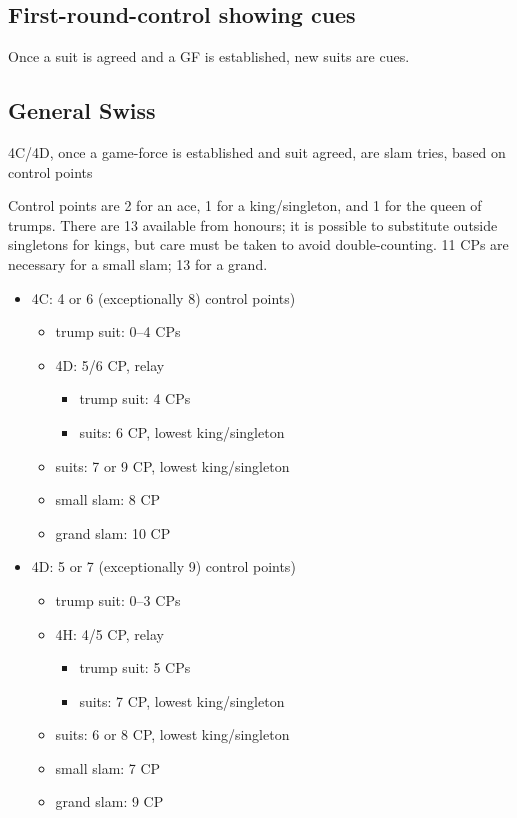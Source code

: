 \documentclass[a4paper,12pt]{article}
\begin{document}
\subsection{First-round-control showing cues}

Once a suit is agreed and a GF is established, new suits are cues.

\subsection{General Swiss}

4C/4D, once a game-force is established and suit agreed, are slam tries, based
on control points

Control points are 2 for an ace, 1 for a king/singleton, and 1 for the queen of
trumps.  There are 13 available from honours; it is possible to substitute
outside singletons for kings, but care must be taken to avoid double-counting.
11 CPs are necessary for a small slam; 13 for a grand.

\begin{itemize}
\item 4C: 4 or 6 (exceptionally 8) control points)
	\begin{itemize}
   \item trump suit: 0--4 CPs
   \item 4D: 5/6 CP, relay
		\begin{itemize}
      \item trump suit: 4 CPs
      \item suits: 6 CP, lowest king/singleton
		\end{itemize}
   \item suits: 7 or 9 CP, lowest king/singleton
   \item small slam: 8 CP
   \item grand slam: 10 CP
	\end{itemize}

\item 4D: 5 or 7 (exceptionally 9) control points)
	\begin{itemize}
   \item trump suit: 0--3 CPs
   \item 4H: 4/5 CP, relay
		\begin{itemize}
      \item trump suit: 5 CPs
      \item suits: 7 CP, lowest king/singleton
		\end{itemize}
   \item suits: 6 or 8 CP, lowest king/singleton
   \item small slam: 7 CP
   \item grand slam: 9 CP
	\end{itemize}
\end{itemize}
\end{document}

